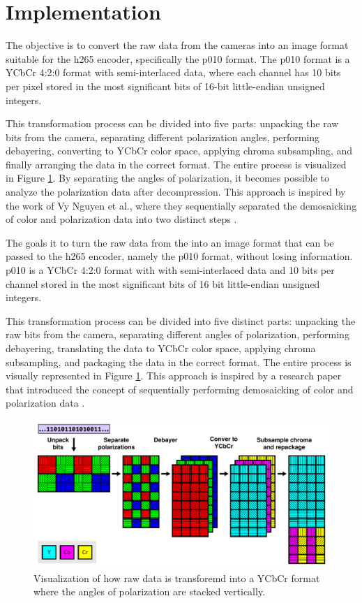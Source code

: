\section{Implementation}
The objective is to convert the raw data from the cameras into an image format suitable for the \gls{h265} encoder, specifically the \gls{p010} format.
The \gls{p010} format is a YCbCr 4:2:0 format with semi-interlaced data, where each channel has 10 bits per pixel stored in the most significant bits of 16-bit little-endian unsigned integers.

This transformation process can be divided into five parts: unpacking the raw bits from the camera, separating different polarization angles, performing debayering, converting to YCbCr color space, applying chroma subsampling, and finally arranging the data in the correct format.
The entire process is visualized in Figure \ref{fig:transform}.
By separating the angles of polarization, it becomes possible to analyze the polarization data after decompression.
This approach is inspired by the work of Vy Nguyen et al., where they sequentially separated the demosaicking of color and polarization data into two distinct steps \cite{nguyenTwoStepColorPolarizationDemosaicking2022}.

The goals it to turn the raw data from the \cams into an image format that can be passed to the \gls{h265} encoder, namely the \gls{p010} format, without losing information.
\gls{p010} is a YCbCr 4:2:0 format with with semi-interlaced data and 10 bits per channel stored in the most significant bits of 16 bit little-endian unsigned integers.

This transformation process can be divided into five distinct parts: unpacking the raw bits from the camera, separating different angles of polarization, performing debayering, translating the data to YCbCr color space, applying chroma subsampling, and packaging the data in the correct format.
The entire process is visually represented in Figure \ref{fig:transform}.
This approach is inspired by a research paper that introduced the concept of sequentially performing demosaicking of color and polarization data \cite{nguyenTwoStepColorPolarizationDemosaicking2022}.

\begin{figure}[H]
    \centering
    \includegraphics[width=\textwidth]{figures/polarized_image/transform.pdf}
    \caption{Visualization of how raw data is transforemd into a YCbCr format where the angles of polarization are stacked vertically.}
    \label{fig:transform}
\end{figure}

